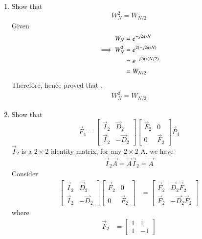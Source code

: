\documentclass[journal,12pt,twocolumn]{IEEEtran}
\renewcommand\thesection{\arabic{section}}
\begin{document}
\begin{enumerate}[label=\arabic*.,ref=\thesection.\theenumi]
	\item Show that 
	\begin{equation}
		W_{N}^{2}=W_{N/2}
	\end{equation}
	\solution Given
	\begin{align}
		W_{N} &= e^{-j2\pi/N}\\
	\implies	W_{N}^{2}&=e^{2\left(-j2\pi/N\right)}\\
		&=e^{-j2\pi/\left(N/2\right)}\\
		&=W_{N/2}
	\end{align}
Therefore, hence proved that ,
\begin{align}
	\label{eq:halving}
	W_N^{2}=W_{N/2}
\end{align}
	\item Show that 
	\begin{equation}
		\vec{F}_{4}=
		\begin{bmatrix}
			\vec{I}_{2} & \vec{D}_{2} \\
			\vec{I}_{2} & -\vec{D}_{2}
		\end{bmatrix}
		\begin{bmatrix}
			\vec{F}_{2} & 0 \\
			0 & \vec{F}_{2}
		\end{bmatrix}
		\vec{P}_{4}
		\label{eq:f4qn}
	\end{equation}
	\solution
	$\vec{I}_2$ is a $2\times 2$ identity matrix, for any $2\times 2$ A, we have 
	\begin{align}
		\vec{I}_2 \vec{A}=\vec{A}\vec{I}_2=\vec{A}
	\end{align}
	Consider
	\begin{align}
		\begin{bmatrix}
			\vec{I}_{2} & \vec{D}_{2} \\
			\vec{I}_{2} & -\vec{D}_{2}
		\end{bmatrix}
		\begin{bmatrix}
			\vec{F}_{2} & 0 \\
			0 & \vec{F}_{2}
		\end{bmatrix}
		&=\begin{bmatrix}
			\vec{F}_{2} & \vec{D}_{2}\vec{F}_{2} \\
			\vec{F}_{2} & -\vec{D}_{2}\vec{F}_{2}
		\end{bmatrix}
	\end{align}
	where
	\begin{align}
		\vec{F}_{2}&=\begin{bmatrix}
			1&1\\1&-1
		\end{bmatrix}\\

\end{align}
\end{enumerate}
\end{document}
